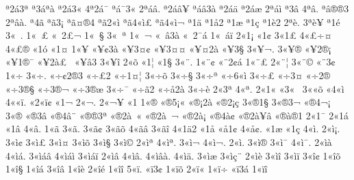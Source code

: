 {^^aa2^^e13^^aa
^^aa3^^e1^^aa^^e0
^^aa2^^e13^^ab
4^^aa2^^e1^^af
^^aa^^e1^^af3^^ab
2^^aa^^e1^^e2.
^^aa2^^e1^^e2^^a5
^^aa^^e1^^e23^^e0
^^aa2^^e1^^e4
^^aa2^^e1^^e6
2^^aa^^e1^^ec
^^aa3^^e2
4^^aa^^e2.
^^aa^^e2^^ae^^ae3
2^^aa^^e2^^e0.
^^aa4^^e3
^^aa^^e33^^a1
^^aa^^e3^^a4^^ae4
^^aa^^e32^^ab^^ec
^^aa^^e34^^ab^^ec^^a3
^^aa^^e34^^ab^^ec^^ac
^^aa1^^e4
^^aa1^^e52
^^aa1^^e6
^^aa1^^e7
^^aa1^^e82
2^^aa^^e8.
3^^aa^^e8^^a5
^^aa1^^e9
3^^ab^^a0.
1^^ab^^a0^^a3
^^ab^^a02^^a3^^ac
1^^ab^^a0^^a7
3^^ab^^a0^^aa
1^^ab^^a0^^ac
^^ab^^a0^^ad^^e23^^e0
^^ab^^a02^^af^^e1
1^^ab^^a0^^e1^^ef
2^^ab1^^a1
^^ab1^^a2
3^^ab1^^a3
4^^ab^^a3^^f7^^a4
4^^ab^^a3^^ae
^^ab1^^f3
^^ab1^^a4
1^^ab^^a5
^^ab^^a5^^a23^^e0
^^ab^^a53^^a4^^a2
^^ab^^a53^^a4^^a4
^^ab^^a5^^a42^^e0
^^ab^^a53^^a7
3^^ab^^a5^^ac.
3^^ab^^a5^^ae
^^ab^^a52^^ae^^a1
^^ab^^a51^^ae^^af
^^ab^^a52^^e0^^a3^^a0
^^ab^^a5^^e23^^ad
3^^ab^^a5^^ee
2^^ab^^f5
^^ab1^^a6
^^ab1^^a7
3^^ab^^a8.
1^^ab^^a8^^a2
^^ab^^a82^^a2^^e1
1^^ab^^a8^^a3
2^^ab^^a8^^a6
3^^ab^^a8^^a9
^^ab^^a83^^ad^^a2
1^^ab^^f7
3^^ab^^f7.
^^ab^^f7^^a22^^ae3
^^ab^^f7^^a32
^^ab^^f71^^a4^^a6
3^^ab^^f7^^f5
3^^ab^^f7^^a7
3^^ab^^f7^^aa
^^ab^^f76^^ab^^ec
3^^ab^^f7^^ad^^a3
^^ab^^f73^^ad^^a4
^^ab^^f72^^ae
^^ab^^f73^^ae^^a7
^^ab^^f73^^ae^^ac
^^ab^^f73^^ae^^e6
3^^ab^^f7^^af
^^ab^^f7^^e32
^^ab^^f7^^e52^^e0
3^^ab^^f7^^e8
2^^ab3^^aa
4^^ab^^aa.
2^^ab1^^ab
^^ab3^^ab^^a0
3^^ab^^ab^^f5
^^ab4^^ab^^ec
4^^ab^^ab^^ef.
^^ab2^^ab^^ef^^a2
^^ab1^^ac
2^^ab^^ac.
2^^ab^^ac^^a5
^^ab1^^ad
1^^ab^^ae
^^ab^^ae5^^a1^^ab
^^ab^^ae^^a12^^e0
^^ab^^ae2^^a1^^e7
3^^ab^^ae1^^a7
3^^ab^^ae3^^ac
^^ab^^ae4^^ac^^a1^^a0
3^^ab^^ae^^ad^^ad
^^ab^^ae3^^ad^^e2
^^ab^^ae4^^ad^^e2^^a8
^^ab^^ae^^ae3^^aa
^^ab^^ae2^^e0^^a0^^ab
^^ab^^ae2^^e0^^a0^^ac
^^ab^^ae2^^e0^^a1
^^ab^^ae4^^e0^^a2
^^ab^^ae2^^e0^^a5^^e2
^^ab^^ae^^e0^^ae1
2^^ab1^^af
2^^ab1^^e1
^^ab1^^e2
4^^ab^^e2.
1^^ab^^e3
3^^ab^^e3.
3^^ab^^e3^^a2
3^^ab^^e3^^f5
4^^ab^^e3^^e2
3^^ab^^e3^^ee
4^^ab1^^e42
^^ab1^^e5
^^ab^^e51^^a2
4^^ab^^e5^^a2.
^^ab1^^e6
^^ab1^^e7
4^^ab^^ec.
2^^ab^^ec^^a1.
3^^ab^^ec^^a2
3^^ab^^ec^^a3
3^^ab^^ec^^a4
3^^ab^^ec^^f5
3^^ab^^ec^^a7
3^^ab^^ec^^a9
2^^ab^^ec^^aa
4^^ab^^ec^^aa.
3^^ab^^ec^^ac
4^^ab^^ec^^ac.
2^^ab^^ec^^ad.
3^^ab^^ec^^ae
3^^ab^^ec^^af
4^^ab^^ec^^af.
2^^ab^^ec^^e0
4^^ab^^ec^^e1.
3^^ab^^ec^^e1^^e2
4^^ab^^ec^^e1^^ec
3^^ab^^ec^^e1^^ef
2^^ab^^ec^^e2
4^^ab^^ec^^e2.
4^^ab^^ec^^e2^^e0.
4^^ab^^ec^^e4.
3^^ab^^ec^^e6
3^^ab^^ec^^e7^^a8
2^^ab^^ec^^e8
3^^ab^^ec^^ee
3^^ab^^ec^^ef
3^^ab^^ee^^a2
1^^ab^^ee^^f5
1^^ab^^ee^^a7
1^^ab^^ee^^e1
3^^ab^^ee^^e2
1^^ab^^ee^^e8
2^^ab^^ee^^e9
1^^ab^^ee^^ee
5^^ab^^ef.
^^ab^^ef3^^a2
1^^ab^^ef^^f5
2^^ab^^ef^^ab
1^^ab^^ef^^ad^^f7
^^ab^^ef3^^e1
1^^ab^^ef^^ee
}
